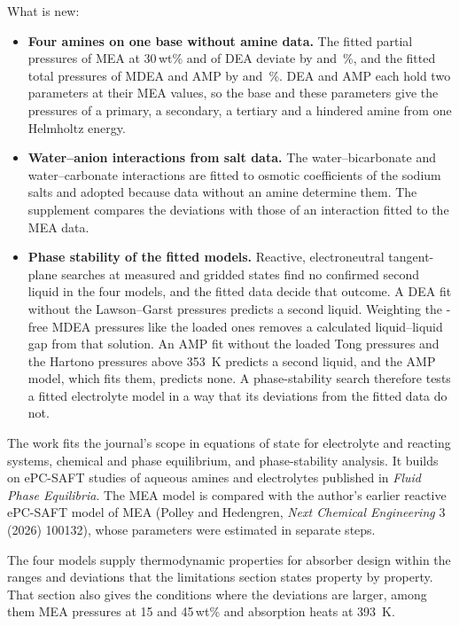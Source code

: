 \documentclass[11pt]{article}
\begin{document}
What is new:
\begin{itemize}
\item \textbf{Four amines on one base without amine data.}
The fitted \COtwo partial pressures of MEA at 30\,wt\% and of DEA deviate by  and \,\%, and the fitted total pressures of MDEA and AMP by  and \,\%.
DEA and AMP each hold two parameters at their MEA values, so the base and these parameters give the pressures of a primary, a secondary, a tertiary and a hindered amine from one Helmholtz energy.
\item \textbf{Water--anion interactions from salt data.}
The water--bicarbonate and water--carbonate interactions are fitted to osmotic coefficients of the sodium salts and adopted because data without an amine determine them.
The supplement compares the deviations with those of an interaction fitted to the MEA data.
\item \textbf{Phase stability of the fitted models.}
Reactive, electroneutral tangent-plane searches at measured and gridded states find no confirmed second liquid in the four models, and the fitted data decide that outcome.
A DEA fit without the Lawson--Garst pressures predicts a second liquid.
Weighting the \COtwo-free MDEA pressures like the loaded ones removes a calculated liquid--liquid gap from that solution.
An AMP fit without the loaded Tong pressures and the Hartono pressures above \SI{353}{\kelvin} predicts a second liquid, and the AMP model, which fits them, predicts none.
A phase-stability search therefore tests a fitted electrolyte model in a way that its deviations from the fitted data do not.
\end{itemize}

The work fits the journal's scope in equations of state for electrolyte and reacting systems, chemical and phase equilibrium, and phase-stability analysis.
It builds on ePC-SAFT studies of aqueous amines and electrolytes published in \textit{Fluid Phase Equilibria}.
The MEA model is compared with the author's earlier reactive ePC-SAFT model of MEA (Polley and Hedengren, \textit{Next Chemical Engineering} 3 (2026) 100132), whose parameters were estimated in separate steps.

The four models supply thermodynamic properties for absorber design within the ranges and deviations that the limitations section states property by property.
That section also gives the conditions where the deviations are larger, among them MEA pressures at 15 and 45\,wt\% and absorption heats at \SI{393}{\kelvin}.
\end{document}

